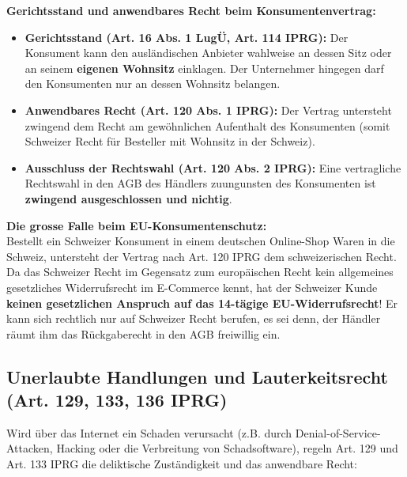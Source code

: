 \begin{definition}
    \textbf{Gerichtsstand und anwendbares Recht beim Konsumentenvertrag:}
    \begin{itemize}
        \item \textbf{Gerichtsstand (Art. 16 Abs. 1 LugÜ, Art. 114 IPRG):} Der Konsument kann den ausländischen Anbieter wahlweise an dessen Sitz oder an seinem \textbf{eigenen Wohnsitz} einklagen. Der Unternehmer hingegen darf den Konsumenten nur an dessen Wohnsitz belangen.
        \item \textbf{Anwendbares Recht (Art. 120 Abs. 1 IPRG):} Der Vertrag untersteht zwingend dem Recht am gewöhnlichen Aufenthalt des Konsumenten (somit Schweizer Recht für Besteller mit Wohnsitz in der Schweiz).
        \item \textbf{Ausschluss der Rechtswahl (Art. 120 Abs. 2 IPRG):} Eine vertragliche Rechtswahl in den AGB des Händlers zuungunsten des Konsumenten ist \textbf{zwingend ausgeschlossen und nichtig}.
    \end{itemize}
\end{definition}

\begin{remark}
    \textbf{Die grosse Falle beim EU-Konsumentenschutz:} \\
    Bestellt ein Schweizer Konsument in einem deutschen Online-Shop Waren in die Schweiz, untersteht der Vertrag nach Art. 120 IPRG dem schweizerischen Recht. Da das Schweizer Recht im Gegensatz zum europäischen Recht kein allgemeines gesetzliches Widerrufsrecht im E-Commerce kennt, hat der Schweizer Kunde \textbf{keinen gesetzlichen Anspruch auf das 14-tägige EU-Widerrufsrecht}! Er kann sich rechtlich nur auf Schweizer Recht berufen, es sei denn, der Händler räumt ihm das Rückgaberecht in den AGB freiwillig ein.
\end{remark}

\subsection{Unerlaubte Handlungen und Lauterkeitsrecht (Art. 129, 133, 136 IPRG)}

Wird über das Internet ein Schaden verursacht (z.B. durch Denial-of-Service-Attacken, Hacking oder die Verbreitung von Schadsoftware), regeln Art. 129 und Art. 133 IPRG die deliktische Zuständigkeit und das anwendbare Recht:

